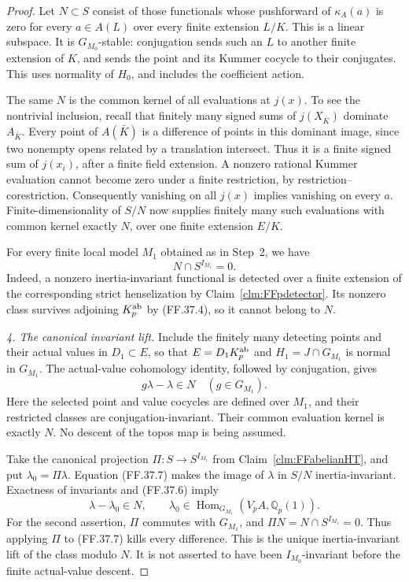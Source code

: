\begin{proof}
Let \(N\subset S\) consist of those
functionals whose pushforward of
\(\kappa_A(a)\) is zero for every
\(a\in A(L)\) over every finite
extension \(L/K\). This is a linear
subspace. It is \(G_{M_0}\)-stable:
conjugation sends such an \(L\) to
another finite extension of \(K\),
and sends the point and its Kummer
cocycle to their conjugates. This
uses normality of \(H_0\), and
includes the coefficient action.

The same \(N\) is the common kernel
of all evaluations at \(j(x)\).
To see the nontrivial inclusion, recall
that finitely many signed sums of
\(j(X_{\bar K})\) dominate \(A_{\bar K}\).
Every point of \(A(\bar K)\) is a
difference of points in this dominant
image, since two nonempty opens related
by a translation intersect. Thus it
is a finite signed sum of \(j(x_i)\),
after a finite field extension.
A nonzero rational Kummer evaluation
cannot become zero under a finite
restriction, by restriction--corestriction.
Consequently vanishing on all \(j(x)\)
implies vanishing on every \(a\).
Finite-dimensionality of \(S/N\)
now supplies finitely many such
evaluations with common kernel
exactly \(N\), over one finite
extension \(E/K\).

For every finite local model \(M_1\)
obtained as in Step~2, we have
\[
                        N\cap S^{I_{M_1}}=0.
                                                        \tag{FF.37.6}
\]
Indeed, a nonzero inertia-invariant
functional is detected over a finite
extension of the corresponding strict
henselization by
Claim~\ref{clm:FFpdetector}. Its
nonzero class survives adjoining
\(K_p^{\rm ab}\) by (FF.37.4),
so it cannot belong to \(N\).

\emph{4. The canonical invariant lift.}
Include the finitely many detecting
points and their actual values in
\(D_1\subset E\), so that
\(E=D_1K_p^{\rm ab}\) and
\(H_1=J\cap G_{M_1}\) is normal
in \(G_{M_1}\). The actual-value
cohomology identity, followed by
conjugation, gives
\[
                  g\lambda-\lambda\in N
                         \quad(g\in G_{M_1}).
                                                        \tag{FF.37.7}
\]
Here the selected point and value
cocycles are defined over \(M_1\),
and their restricted classes are
conjugation-invariant. Their common
evaluation kernel is exactly \(N\).
No descent of the topos map is
being assumed.

Take the canonical projection
\(\Pi:S\to S^{I_{M_1}}\) from
Claim~\ref{clm:FFabelianHT}, and put
\(\lambda_0=\Pi\lambda\).
Equation (FF.37.7) makes the image
of \(\lambda\) in \(S/N\)
inertia-invariant. Exactness of
invariants and (FF.37.6) imply
\[
               \lambda-\lambda_0\in N,
           \qquad \lambda_0\in
             \operatorname{Hom}_{G_{M_1}}(V_pA,\mathbb Q_p(1)).
                                                        \tag{FF.37.8}
\]
For the second assertion, \(\Pi\)
commutes with \(G_{M_1}\), and
\(\Pi N=N\cap S^{I_{M_1}}=0\).
Thus applying \(\Pi\) to
(FF.37.7) kills every difference.
This is the unique inertia-invariant
lift of the class modulo \(N\).
It is not asserted to have been
\(I_{M_0}\)-invariant before the
finite actual-value descent.


\end{proof}
